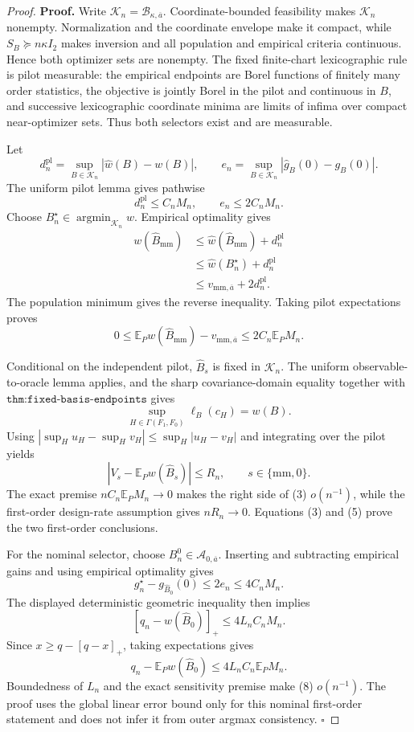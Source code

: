 \documentclass{article}
\begin{document}
\begin{proof}
\textbf{Proof.}
Write \(\mathcal K_n=\mathcal B_{\kappa,\overline a}\).  Coordinate-bounded feasibility makes \(\mathcal K_n\) nonempty.  Normalization and the coordinate envelope make it compact, while \(S_B\succeq n\kappa I_2\) makes inversion and all population and empirical criteria continuous.  Hence both optimizer sets are nonempty.  The fixed finite-chart lexicographic rule is pilot measurable: the empirical endpoints are Borel functions of finitely many order statistics, the objective is jointly Borel in the pilot and continuous in \(B\), and successive lexicographic coordinate minima are limits of infima over compact near-optimizer sets.  Thus both selectors exist and are measurable.

Let
\[
d_n^{\mathrm{pl}}=\sup_{B\in\mathcal K_n}|\widehat w(B)-w(B)|,
\qquad
e_n=\sup_{B\in\mathcal K_n}|\widehat g_B(0)-g_B(0)|.
\]
The uniform pilot lemma gives pathwise
\[
d_n^{\mathrm{pl}}\le C_nM_n,
\qquad e_n\le2C_nM_n.
\tag{1}
\]
Choose \(B_n^\star\in\operatorname*{argmin}_{\mathcal K_n}w\).  Empirical optimality gives
\[
\begin{aligned}
w(\widehat B_{\mathrm{mm}})
&\le\widehat w(\widehat B_{\mathrm{mm}})+d_n^{\mathrm{pl}}\\
&\le\widehat w(B_n^\star)+d_n^{\mathrm{pl}}\\
&\le v_{\mathrm{mm},\overline a}+2d_n^{\mathrm{pl}}.
\end{aligned}
\tag{2}
\]
The population minimum gives the reverse inequality.  Taking pilot expectations proves
\[
0\le\mathbb E_Pw(\widehat B_{\mathrm{mm}})-v_{\mathrm{mm},\overline a}
\le2C_n\mathbb E_PM_n.
\tag{3}
\]

Conditional on the independent pilot, \(\widehat B_s\) is fixed in \(\mathcal K_n\).  The uniform observable-to-oracle lemma applies, and the sharp covariance-domain equality together with \(\texttt{thm:fixed-basis-endpoints}\) gives
\[
\sup_{H\in\Gamma(F_1,F_0)}\ell_B(c_H)=w(B).
\tag{4}
\]
Using \(|\sup_Hu_H-\sup_Hv_H|\le\sup_H|u_H-v_H|\) and integrating over the pilot yields
\[
|V_s-\mathbb E_Pw(\widehat B_s)|\le R_n,
\qquad s\in\{\mathrm{mm},0\}.
\tag{5}
\]
The exact premise \(nC_n\mathbb E_PM_n\to0\) makes the right side of (3) \(o(n^{-1})\), while the first-order design-rate assumption gives \(nR_n\to0\).  Equations (3) and (5) prove the two first-order conclusions.

For the nominal selector, choose \(B_n^0\in\mathcal A_{0,\overline a}\).  Inserting and subtracting empirical gains and using empirical optimality gives
\[
g_n^\star-g_{\widehat B_0}(0)\le2e_n\le4C_nM_n.
\tag{6}
\]
The displayed deterministic geometric inequality then implies
\[
[q_n-w(\widehat B_0)]_+\le4L_nC_nM_n.
\tag{7}
\]
Since \(x\ge q-[q-x]_+\), taking expectations gives
\[
q_n-\mathbb E_Pw(\widehat B_0)\le4L_nC_n\mathbb E_PM_n.
\tag{8}
\]
Boundedness of \(L_n\) and the exact sensitivity premise make (8) \(o(n^{-1})\).  The proof uses the global linear error bound only for this nominal first-order statement and does not infer it from outer argmax consistency. \(\square\)
\end{proof}
\end{document}

